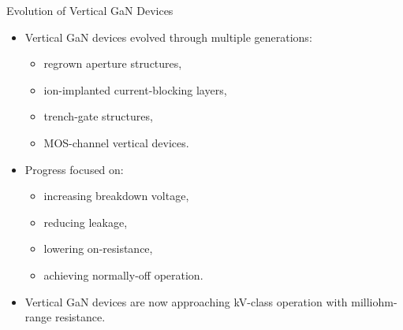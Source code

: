 \begin{frame}{Evolution of Vertical GaN Devices}

\begin{itemize}
    \item Vertical GaN devices evolved through multiple generations:
    \begin{itemize}
        \item regrown aperture structures,
        \item ion-implanted current-blocking layers,
        \item trench-gate structures,
        \item MOS-channel vertical devices.
    \end{itemize}

    \item Progress focused on:
    \begin{itemize}
        \item increasing breakdown voltage,
        \item reducing leakage,
        \item lowering on-resistance,
        \item achieving normally-off operation.
    \end{itemize}

    \item Vertical GaN devices are now approaching kV-class operation with milliohm-range resistance.
\end{itemize}


\end{frame}


